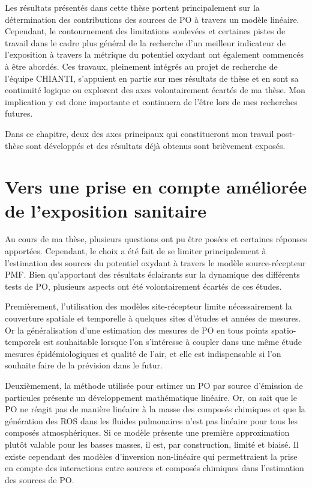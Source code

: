 
Les résultats présentés dans cette thèse portent principalement sur la détermination des
contributions des sources de PO à travers un modèle linéaire.  Cependant, le contournement
des limitations soulevées et certaines pistes de travail dans le cadre plus général de la
recherche d'un meilleur indicateur de l'exposition à travers la métrique du potentiel
oxydant ont également commencés à être abordés.  Ces travaux, pleinement intégrés au
projet de recherche de l'équipe CHIANTI, s'appuient en partie sur mes résultats de thèse et
en sont sa continuité logique ou explorent des axes volontairement écartés de ma thèse.
Mon implication y est donc importante et continuera de l'être lors de mes recherches
futures.

Dans ce chapitre, deux des axes principaux qui constitueront mon travail post-thèse sont
développés et des résultats déjà obtenus sont brièvement exposés.

\section{Vers une prise en compte améliorée de l'exposition sanitaire}%

Au cours de ma thèse, plusieurs questions ont pu être posées et certaines réponses
apportées.  Cependant, le choix a été fait de se limiter principalement à l'estimation des
sources du potentiel oxydant à travers le modèle source-récepteur PMF. Bien qu'apportant
des résultats éclairants sur la dynamique des différents tests de PO, plusieurs aspects ont
été volontairement écartés de ces études.

Premièrement, l'utilisation des modèles site-récepteur limite nécessairement la couverture
spatiale et temporelle à quelques sites d'études et années de mesures. Or la
généralisation d'une estimation des mesures de PO en tous points spatio-temporels est
souhaitable lorsque l'on s'intéresse à coupler dans une même étude mesures
épidémiologiques et qualité de l'air, et elle est indispensable si l'on souhaite faire de
la prévision dans le futur.

Deuxièmement, la méthode utilisée pour estimer un PO par source d'émission de particules
présente un développement mathématique linéaire. Or, on sait que le PO ne réagit pas de
manière linéaire à la masse des composés chimiques et que la génération des ROS dans les
fluides pulmonaires n'est pas linéaire pour tous les composés atmosphériques. Si ce modèle
présente une première approximation plutôt valable pour les basses masses, il est, par
construction, limité et biaisé.  Il existe cependant des modèles d'inversion non-linéaire
qui permettraient la prise en compte des interactions entre sources et composés chimiques
dans l'estimation des sources de PO.

